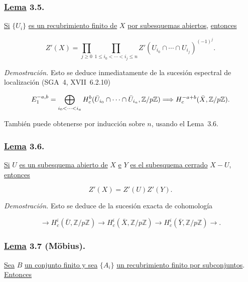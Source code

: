\subsubsection*{\underline{Lema} 3.5.}
\underline{Si} $\{U_i\}$ \underline{es un recubrimiento finito de} $X$ \underline{por subesquemas abiertos},
\underline{entonces}

\begin{equation}\tag{3.5.1}
Z'(X)=
\prod_{j\geq0}
\prod_{1\leq i_0<\cdots<i_j\leq n}
Z'(U_{i_0}\cap\cdots\cap U_{i_j})^{(-1)^j}.
\end{equation}

\medskip
\noindent\emph{Demostración.}
Esto se deduce inmediatamente de la sucesión espectral de localización
(SGA~4, XVII~6.2.10)

\[
E_1^{-a,b}=\bigoplus_{i_0<\cdots<i_{\sisi{b}{a}}}
H_c^{\sisi{a}{b}}(\bar U_{i_0}\cap\cdots\cap\bar U_{i_{\sisi{b}{a}}},\mathbb Z/p\mathbb Z)
\Longrightarrow H_c^{-a+b}(\bar X,\mathbb Z/p\mathbb Z).
\]

También puede obtenerse por inducción sobre $n$, usando el Lema~3.6.

\subsubsection*{\underline{Lema} 3.6.}
\underline{Si} $U$ \underline{es un subesquema abierto de} $X$ \underline{e} $Y$ \underline{es el subesquema cerrado}
$X-U$, \underline{entonces}

\begin{equation}\tag{3.6.1}
Z'(X)=Z'(U)Z'(Y).
\end{equation}

\medskip
\noindent\emph{Demostración.}
Esto se deduce de la sucesión exacta de cohomología

\begin{equation}\tag{3.6.2}
\longrightarrow H_c^i(\bar U,\mathbb Z/p\mathbb Z)
\longrightarrow H_c^i(\bar X,\mathbb Z/p\mathbb Z)
\longrightarrow H_c^i(\bar Y,\mathbb Z/p\mathbb Z)\longrightarrow.
\end{equation}

\pageoriginale

\subsubsection*{\underline{Lema} 3.7 (Möbius).}
\underline{Sea} $B$ \underline{un conjunto finito y sea} $\{A_i\}$ \underline{un recubrimiento finito por
subconjuntos}. \underline{Entonces}

